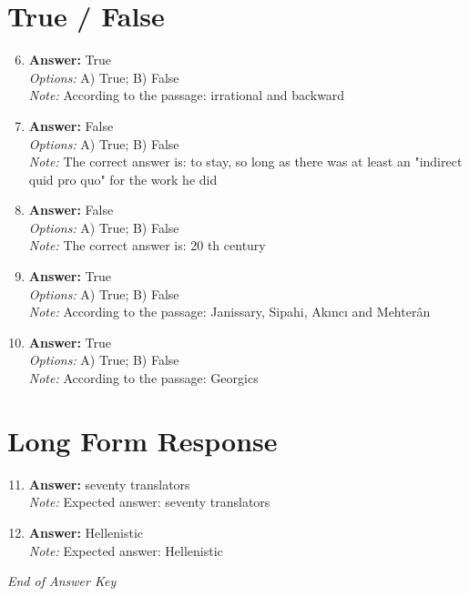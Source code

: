 \documentclass[12pt]{article}
\begin{document}
\section*{True / False}
\begin{enumerate}[label=\arabic*.]
\setcounter{enumi}{5}
\item \textbf{Answer:} True
\\ \textit{Options:} A) True; B) False
\\ \textit{Note:} According to the passage: irrational and backward
\item \textbf{Answer:} False
\\ \textit{Options:} A) True; B) False
\\ \textit{Note:} The correct answer is: to stay, so long as there was at least an "indirect quid pro quo" for the work he did
\item \textbf{Answer:} False
\\ \textit{Options:} A) True; B) False
\\ \textit{Note:} The correct answer is: 20 th century
\item \textbf{Answer:} True
\\ \textit{Options:} A) True; B) False
\\ \textit{Note:} According to the passage: Janissary, Sipahi, Akıncı and Mehterân
\item \textbf{Answer:} True
\\ \textit{Options:} A) True; B) False
\\ \textit{Note:} According to the passage: Georgics
\end{enumerate}

\section*{Long Form Response}
\begin{enumerate}[label=\arabic*.]
\setcounter{enumi}{10}
\item \textbf{Answer:} seventy translators
\\ \textit{Note:} Expected answer: seventy translators
\item \textbf{Answer:} Hellenistic
\\ \textit{Note:} Expected answer: Hellenistic
\end{enumerate}

\vfill
\noindent\textit{End of Answer Key}
\end{document}
